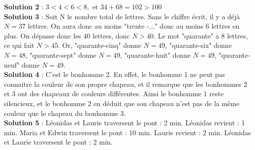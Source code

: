 \documentclass{article}
\begin{document}
\textbf{Solution 2} :  $3 < 4 < 6 < 8, \text{ et } 34+ 68=102 > 100$ \\



\textbf{Solution 3} : Soit N le nombre total de lettres. Sans le chiffre  écrit, il y a déjà $N = 37$ lettres. On aura donc au moins "trente -..." donc au moins 6 lettres en plus. On dépasse donc les 40 lettres, donc $N > 40$. Le mot "quarante" a 8 lettres, ce qui fait $N > 45$. Or, "quarante-cinq" donne $N = 49$, "quarante-six" donne $N = 48$, "quarante-sept" donne $N = 49$, "quarante-huit" donne $N = 49$, "quarante-neuf" donne $N = 49$. \\

\textbf{Solution 4 } : C’est le bonhomme 2. En effet, le bonhomme 1 ne peut pas connaitre la couleur de son propre chapeau, et il remarque que les bonhommes 2 et 3 ont des chapeaux de couleurs différentes. Ainsi le bonhomme 1 reste silencieux, et le bonhomme 2 en déduit que son chapeau n'est pas de la même couleur que le chapeau du bonhomme 3. \\

\textbf{Solution 5} : Léonidas et Laurie traversent le pont : 2 min. Léonidas revient : 1 min. Maria et Edwin traversent le pont : 10 min. Laurie revient : 2 min. Léonidas et Laurie traversent le pont : 2 min. \\

\end{document}
